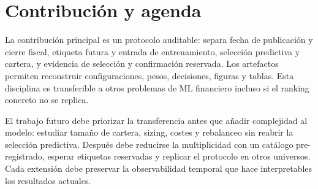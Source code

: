 \section{Contribución y agenda}

La contribución principal es un protocolo auditable: separa fecha de publicación y cierre fiscal,
etiqueta futura y entrada de entrenamiento, selección predictiva y cartera, y evidencia de selección
y confirmación reservada. Los artefactos permiten reconstruir configuraciones, pesos, decisiones,
figuras y tablas. Esta disciplina es transferible a otros problemas de ML financiero incluso si el
ranking concreto no se replica.

El trabajo futuro debe priorizar la transferencia antes que añadir complejidad al modelo: estudiar
tamaño de cartera, sizing, costes y rebalanceo sin reabrir la selección predictiva. Después debe
reducirse la multiplicidad con un catálogo pre-registrado, esperar etiquetas reservadas y replicar
el protocolo en otros universos. Cada extensión debe preservar la observabilidad temporal que hace
interpretables los resultados actuales.
